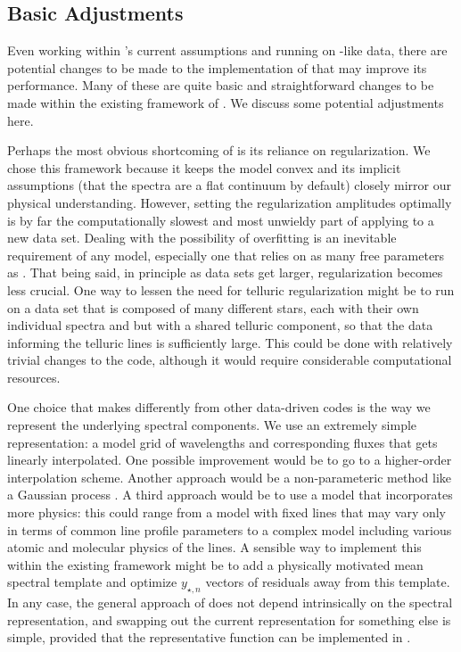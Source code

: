\documentclass[twocolumn]{aastex62}
\begin{document}
\subsection{Basic Adjustments}
\label{s:improvements}

Even working within \wobble's current assumptions and running on \HARPS-like data, there are potential changes to be made to the implementation of \wobble that may improve its performance. 
Many of these are quite basic and straightforward changes to be made within the existing framework of \wobble. 
We discuss some potential adjustments here.

Perhaps the most obvious shortcoming of \wobble is its reliance on regularization. 
We chose this framework because it keeps the model convex and its implicit assumptions (that the spectra are a flat continuum by default) closely mirror our physical understanding. 
However, setting the regularization amplitudes optimally is by far the computationally slowest and most unwieldy part of applying \wobble to a new data set. 
Dealing with the possibility of overfitting is an inevitable requirement of any model, especially one that relies on as many free parameters as \wobble. 
That being said, in principle as data sets get larger, regularization becomes less crucial. 
One way to lessen the need for telluric regularization might be to run on a data set that is composed of many different stars, each with their own individual spectra and \RVs but with a shared telluric component, so that the data informing the telluric lines is sufficiently large. 
This could be done with relatively trivial changes to the \wobble code, although it would require considerable computational resources.

One choice that \wobble makes differently from other data-driven \RV codes is the way we represent the underlying spectral components. 
We use an extremely simple representation: a model grid of wavelengths and corresponding fluxes that gets linearly interpolated. 
One possible improvement would be to go to a higher-order interpolation scheme. 
Another approach would be a non-parameteric method like a Gaussian process \citep[as in][]{Czekala2017}. 
A third approach would be to use a model that incorporates more physics: this could range from a model with fixed lines that may vary only in terms of common line profile parameters to a complex model including various atomic and molecular physics of the lines. 
A sensible way to implement this within the existing \wobble framework might be to add a physically motivated mean spectral template and optimize $y_{\star, n}$ vectors of residuals away from this template. 
In any case, the general approach of \wobble does not depend intrinsically on the spectral representation, and swapping out the current representation for something else is simple, provided that the representative function can be implemented in \TF.
\end{document}
